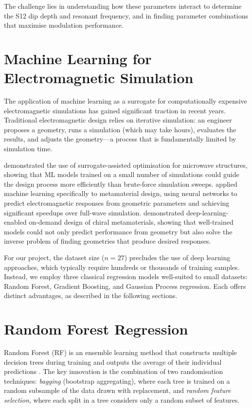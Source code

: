 \documentclass[12pt,a4paper]{report}
\begin{document}
The challenge lies in understanding how these parameters interact to determine the S12 dip depth and resonant frequency, and in finding parameter combinations that maximise modulation performance.

\section{Machine Learning for Electromagnetic Simulation}
\label{sec:ml_em}

The application of machine learning as a surrogate for computationally expensive electromagnetic simulations has gained significant traction in recent years. Traditional electromagnetic design relies on iterative simulation: an engineer proposes a geometry, runs a simulation (which may take hours), evaluates the results, and adjusts the geometry---a process that is fundamentally limited by simulation time.

\citet{koziel2013} demonstrated the use of surrogate-assisted optimisation for microwave structures, showing that ML models trained on a small number of simulations could guide the design process more efficiently than brute-force simulation sweeps. \citet{zhang2019} applied machine learning specifically to metamaterial design, using neural networks to predict electromagnetic responses from geometric parameters and achieving significant speedups over full-wave simulation. \citet{ma2018} demonstrated deep-learning-enabled on-demand design of chiral metamaterials, showing that well-trained models could not only predict performance from geometry but also solve the inverse problem of finding geometries that produce desired responses.

For our project, the dataset size ($n = 27$) precludes the use of deep learning approaches, which typically require hundreds or thousands of training samples. Instead, we employ three classical regression models well-suited to small datasets: Random Forest, Gradient Boosting, and Gaussian Process regression. Each offers distinct advantages, as described in the following sections.

\section{Random Forest Regression}
\label{sec:rf}

Random Forest (RF) is an ensemble learning method that constructs multiple decision trees during training and outputs the average of their individual predictions \citep{breiman2001}. The key innovation is the combination of two randomisation techniques: \textit{bagging} (bootstrap aggregating), where each tree is trained on a random subsample of the data drawn with replacement, and \textit{random feature selection}, where each split in a tree considers only a random subset of features.
\end{document}
